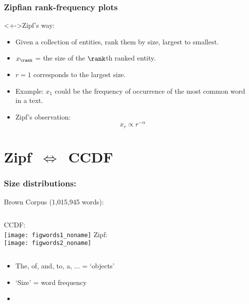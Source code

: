 \begin{frame}
  \frametitle{Zipfian rank-frequency plots}

  \begin{block}<+->{Zipf's way:}
  \begin{itemize}
  \item<+->
    Given a collection of entities, rank them by
    size, largest to smallest.
  \item<+->
    $x_\rank$ = the size of the $\rank$th ranked entity.
  \item<+-> 
    $r=1$ corresponds to the largest size.
  \item<+-> 
    Example: $x_1$ could be the frequency of occurrence of
    the most common word in a text.
  \item<+->
    Zipf's observation:
    $$ x_r \propto r^{-\alpha} $$
  \end{itemize}
  \end{block}

\end{frame}

\section{Zipf\ \texorpdfstring{$\Leftrightarrow$}{is\ equivalent\ to}\ CCDF}

\begin{frame}
  \frametitle{Size distributions:}

  \begin{block}{Brown Corpus (1,015,945 words):}
    \medskip
    \begin{columns}
      CCDF:\\
      \texttt{[image: figwords1\_noname]}
      Zipf:\\
      \texttt{[image: figwords2\_noname]}
    \end{columns}
  \end{block}

  \begin{block}{}
    \begin{itemize}
    \item 
      The, of, and, to, a, ...  = `objects'
    \item 
      `Size' = word frequency
    \item<2->
    \end{itemize}
  \end{block}

\end{frame}

